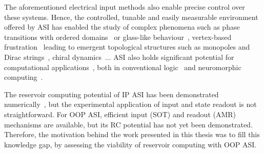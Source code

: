 The aforementioned electrical input methods also enable precise control over these systems.
Hence, the controlled, tunable and easily measurable environment offered by ASI has enabled the study of complex phenomena such as phase transitions with ordered domains~\cite{ApparentFMpinwheel,sklenar2019field,MeltingASI,ImagingBridgedKagome,sendetskyi2019continuous,lou2023competing,branford2012emerging} or glass-like behaviour~\cite{wang2006artificial,ZeroPointEntropy}, vertex-based frustration~\cite{morrison2013unhappy,nisoli2018topologytetris} leading to emergent topological structures such as monopoles and Dirac strings~\cite{ObservationMonopoleASI,mengotti2011kagome}, chiral dynamics~\cite{branford2012emerging,EmergentChiralityRatchet}...
ASI also holds significant potential for computational applications~\cite{heyderman2022spin}, both in conventional logic~\cite{ComputationalLogic_2018,Gypens_Balanced,EngineeringRelaxationComputation} and neuromorphic computing~\cite{ASI_computation,RC_RecentAdvances}. \par
The reservoir computing potential of IP ASI has been demonstrated numerically~\cite{RC_ASI}, but the experimental application of input and state readout is not straightforward.
For OOP ASI, efficient input (SOT) and readout (AMR) mechanisms are available, but its RC potential has not yet been demonstrated.
Therefore, the motivation behind the work presented in this thesis was to fill this knowledge gap, by assessing the viability of reservoir computing with OOP ASI.

